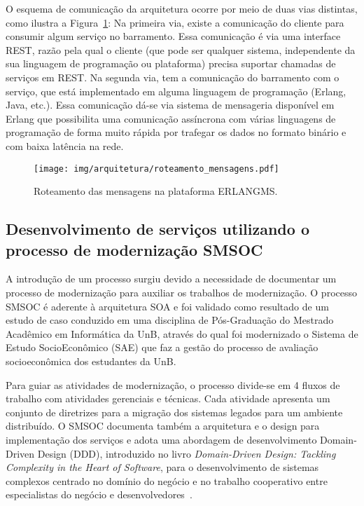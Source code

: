 \documentclass[12pt]{article}
\begin{document}
O esquema de comunicação da arquitetura ocorre por meio de 
duas vias distintas, como ilustra a Figura~\ref{fig:roteamento_mensagens}: Na primeira via, 
existe a comunicação do cliente para 
consumir algum serviço no barramento. Essa comunicação é via uma 
interface REST, razão pela qual o cliente (que pode ser qualquer sistema, 
independente da sua linguagem de programação ou plataforma) 
precisa suportar chamadas de serviços em REST. Na segunda via, tem a comunicação 
do barramento com o serviço, que está implementado em 
alguma linguagem de programação (Erlang, Java, etc.). Essa comunicação dá-se via
sistema de mensageria disponível em Erlang que possibilita uma comunicação assíncrona 
com várias linguagens de programação de forma muito rápida por trafegar os dados 
no formato binário e com baixa latência na rede\cite{Armstrong:2013:PES:2566708}.

\begin{figure}[htb]
\centering
\texttt{[image: img/arquitetura/roteamento\_mensagens.pdf]}
\caption{Roteamento das mensagens na plataforma ERLANGMS.}
\label{fig:roteamento_mensagens}
\end{figure}






\subsection{Desenvolvimento de serviços utilizando o processo de modernização SMSOC}\label{smsoc}

A introdução de um processo surgiu devido a necessidade
de documentar um processo de modernização 
para auxiliar os trabalhos de modernização.
O processo SMSOC é 
aderente à arquitetura SOA 
e foi validado como  
resultado de um estudo de caso
conduzido em uma disciplina de Pós-Graduação
do Mestrado Acadêmico em Informática da UnB,
através do qual foi modernizado 
o Sistema de Estudo SocioEconômico (SAE)
que faz a gestão do processo de 
avaliação socioeconômica dos estudantes da UnB.

Para guiar as atividades de modernização, o processo 
divide-se em 4 fluxos de trabalho com atividades gerenciais e técnicas. Cada
atividade apresenta um conjunto de diretrizes para
a migração dos sistemas legados para um ambiente distribuído. 
O SMSOC documenta também a arquitetura e o design
para implementação dos serviços e adota uma 
abordagem de desenvolvimento Domain-Driven
Design (DDD), introduzido no livro \textit{Domain-Driven Design: Tackling Complexity in the
Heart of Software}, para o desenvolvimento de sistemas complexos centrado no domínio
do negócio e no trabalho cooperativo entre especialistas do negócio e desenvolvedores~\cite{evans2004domain}.
\end{document}
